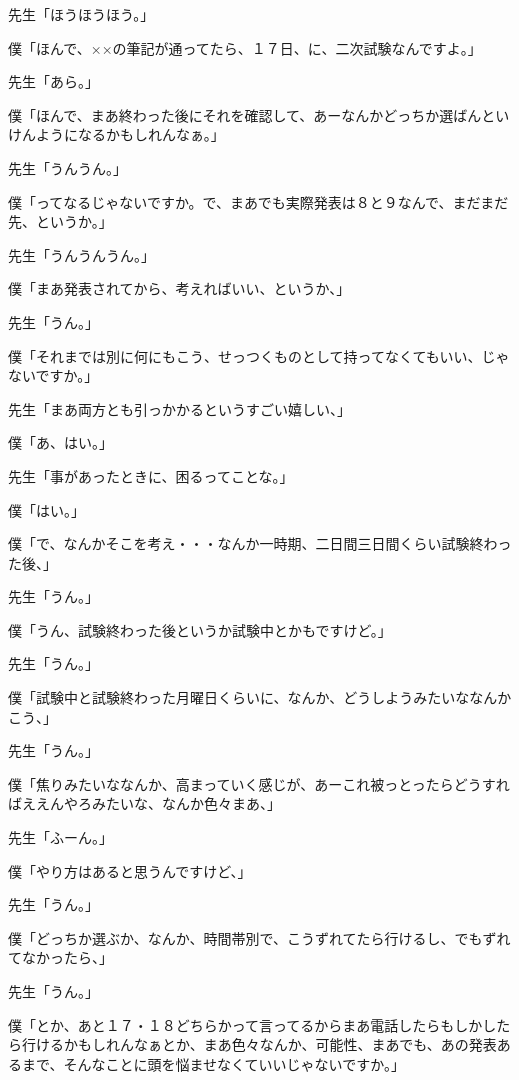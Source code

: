 \documentclass[b5j,twoside,twocolumn]{utarticle}
\begin{document}
\begin{description}
\item 先生「ほうほうほう。」
\item 僕「ほんで、××の筆記が通ってたら、１７日、に、二次試験なんですよ。」
\item 先生「あら。」
\item 僕「ほんで、まあ終わった後にそれを確認して、あーなんかどっちか選ばんといけんようになるかもしれんなぁ。」
\item 先生「うんうん。」
\item 僕「ってなるじゃないですか。で、まあでも実際発表は８と９なんで、まだまだ先、というか。」
\item 先生「うんうんうん。」
\item 僕「まあ発表されてから、考えればいい、というか、」
\item 先生「うん。」
\item 僕「それまでは別に何にもこう、せっつくものとして持ってなくてもいい、じゃないですか。」
\item 先生「まあ両方とも引っかかるというすごい嬉しい、」
\item 僕「あ、はい。」
\item 先生「事があったときに、困るってことな。」
\item 僕「はい。」
\item 僕「で、なんかそこを考え・・・なんか一時期、二日間三日間くらい試験終わった後、」
\item 先生「うん。」
\item 僕「うん、試験終わった後というか試験中とかもですけど。」
\item 先生「うん。」
\item 僕「試験中と試験終わった月曜日くらいに、なんか、どうしようみたいななんかこう、」
\item 先生「うん。」
\item 僕「焦りみたいななんか、高まっていく感じが、あーこれ被っとったらどうすればええんやろみたいな、なんか色々まあ、」
\item 先生「ふーん。」
\item 僕「やり方はあると思うんですけど、」
\item 先生「うん。」
\item 僕「どっちか選ぶか、なんか、時間帯別で、こうずれてたら行けるし、でもずれてなかったら、」
\item 先生「うん。」
\item 僕「とか、あと１７・１８どちらかって言ってるからまあ電話したらもしかしたら行けるかもしれんなぁとか、まあ色々なんか、可能性、まあでも、あの発表あるまで、そんなことに頭を悩ませなくていいじゃないですか。」

\end{description}
\end{document}
